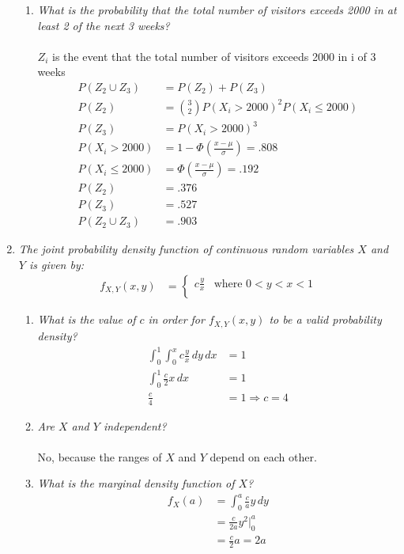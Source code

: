 \documentclass{article} %
\begin{document}
\begin{enumerate}
\begin{enumerate}
		\item \textit{What is the probability that the total number of visitors exceeds 2000 in at least 2 of the next 3 weeks?}\\
		\\
		$Z_i$ is the event that the total number of visitors exceeds 2000 in i of 3 weeks
		\begin{align*}
		P(Z_2 \cup Z_3) &= P(Z_2) + P(Z_3)\\
		P(Z_2) &= \binom{3}{2}P(X_i > 2000)^2P(X_i \leq 2000)\\
		P(Z_3) &= P(X_i > 2000)^3\\
		P(X_i > 2000) &= 1 - \Phi(\frac{x - \mu}{\sigma}) = .808\\
		P(X_i \leq 2000) &= \Phi(\frac{x - \mu}{\sigma}) = .192\\
		P(Z_2) &= .376\\
		P(Z_3) &= .527\\
		P(Z_2 \cup Z_3) &= .903
		\end{align*}
		
	\end{enumerate}
	
	\item \textit{The joint probability density function of continuous random variables $X$ and $Y$ is given by:}
	\begin{align*}
		f_{X,Y}(x,y) &= 
			\begin{cases}
			c\frac{y}{x} &\text{where } 0 < y < x < 1\\
			\end{cases}
	\end{align*}
	
	\begin{enumerate}
		\item \textit{What is the value of $c$ in order for $f_{X,Y}(x,y)$ to be a valid probability density?}
		\begin{align*}
		\int_{0}^{1} \int_{0}^{x} c\frac{y}{x}\,dy\,dx &= 1\\
		\int_{0}^{1} \frac{c}{2}x \,dx &= 1\\
		\frac{c}{4} &= 1 \Rightarrow c = 4
		\end{align*}
		
		\item \textit{Are $X$ and $Y$ independent?}\\
		\\
		No, because the ranges of $X$ and $Y$ depend on each other.\\
		
		\item \textit{What is the marginal density function of $X$?}
		\begin{align*}
		f_X(a) &= \int_{0}^{a} \frac{c}{a}y\,dy\\
		&= \frac{c}{2a}y^2 \Big|_{0}^{a}\\
		&= \frac{c}{2}a = 2a
		\end{align*}
		

\end{enumerate}
\end{enumerate}
\end{document}
